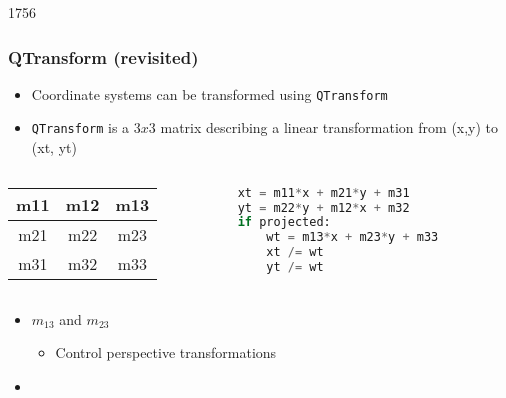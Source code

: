 
\begin{slide}[fragile]{1756}


\frametitle{QTransform (revisited)}
\begin{itemize}
\item Coordinate systems can be transformed using \texttt{QTransform}
\item \texttt{QTransform} is a $3x3$ matrix describing a linear transformation from (x,y) to (xt, yt)
\end{itemize}
\begin{columns}[t]
\begin{column}{50mm}

\begin{tabular}{c|c|c}
m11 & m12 & m13 \\ \hline
m21 & m22 & m23 \\ \hline
m31 & m32 & m33 \\
\end{tabular}

\end{column}
\begin{column}{50mm}

\begin{lstlisting}[language=Python]
xt = m11*x + m21*y + m31 
yt = m22*y + m12*x + m32 
if projected: 
    wt = m13*x + m23*y + m33  
    xt /= wt 
    yt /= wt 
\end{lstlisting}
\end{column}
\end{columns}
\begin{itemize}
\item $m_{13}$ and $m_{23}$
    \begin{itemize}
    \item Control perspective transformations
    \end{itemize}
\item {}
\end{itemize}

\end{slide}


